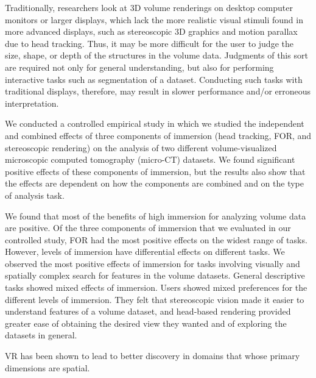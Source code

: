Traditionally, researchers look at 3D volume renderings on desktop computer monitors or larger displays, which lack the more realistic visual stimuli found in more advanced displays, such as stereoscopic 3D graphics and motion parallax due to head tracking. Thus, it may be more difficult for the user to judge the size, shape, or depth of the structures in the volume data. Judgments of this sort are required not only for general understanding, but also for performing interactive tasks such as segmentation of a dataset. Conducting such tasks with traditional displays, therefore, may result in slower performance and/or erroneous interpretation.
\cite{Laha2012}

We conducted a controlled empirical study in which we studied the independent and combined effects of three components of immersion (head tracking, FOR, and stereoscopic rendering) on the analysis of two different volume-visualized microscopic computed tomography (micro-CT) datasets. We found significant positive effects of these components of immersion, but the results also show that the effects are dependent on how the components are combined and on the type of analysis task.
\cite{Laha2012}

We found that most of the benefits of high immersion for analyzing volume data are positive. Of the three components of immersion that we evaluated in our controlled study, FOR had the most positive effects on the widest range of tasks. However, levels of immersion have differential effects on different tasks. We observed the most positive effects of immersion for tasks involving visually and spatially complex search for features in the volume datasets. General descriptive tasks showed mixed effects of immersion. Users showed mixed preferences for the different levels of immersion. They felt that stereoscopic vision made it easier to understand features of a volume dataset, and head-based rendering provided greater ease of obtaining the desired view they wanted and of exploring the datasets in general.
\cite{Laha2012}

VR has been shown to lead to better discovery in domains that whose primary dimensions are spatial.
\cite{Donalek2014}

